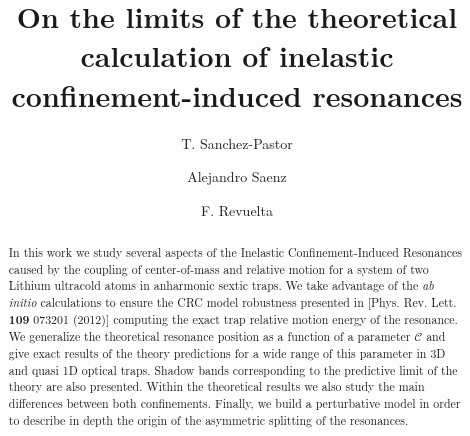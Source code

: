 \documentclass[aps,pre,twocolumn,superscriptaddress,showpacs]{revtex4-1}
\newcommand{\abinitio}{\textit{ab initio }}
\begin{document}
\title{On the limits of the theoretical calculation of inelastic confinement-induced resonances}
%
\author{T. Sanchez-Pastor}

\author{Alejandro Saenz}

\author{F. Revuelta}
%
\begin{abstract}
In this work we study several aspects of the Inelastic Confinement-Induced Resonances caused by the coupling of center-of-mass and relative motion for a system of two Lithium ultracold atoms in anharmonic sextic traps. We take advantage of the \abinitio calculations to ensure the CRC model robustness presented in [Phys. Rev. Lett. \textbf{109} 073201 (2012)] computing the exact trap relative motion energy of the resonance. We generalize the theoretical resonance position as a function of a parameter $\mathcal{C}$ and give exact results of the theory predictions for a wide range of this parameter in 3D and quasi 1D optical traps. Shadow bands corresponding to the predictive limit of the theory are also presented. Within the theoretical results we also study the main differences between both confinements. Finally, we build a perturbative model in order to describe in depth the origin of the asymmetric splitting of the resonances.
\end{abstract}

\maketitle

\end{document}
